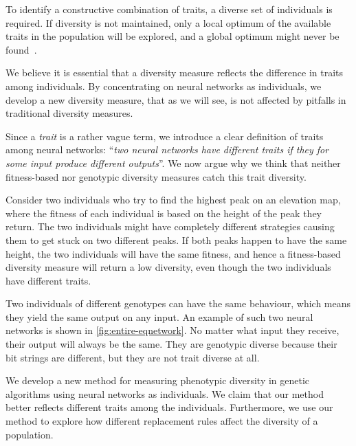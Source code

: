 To identify a constructive combination of traits, a diverse set of individuals is required. If diversity is not maintained, only a local optimum of the available traits in the population will be explored, and a global optimum might never be found~\cite{ursem2002diversity}.

We believe it is essential that a diversity measure reflects the difference in traits among individuals. By concentrating on neural networks as individuals, we develop a new diversity measure, that as we will see, is not affected by pitfalls in traditional diversity measures.

Since a \emph{trait} is a rather vague term, we introduce a clear definition of traits among neural networks: ``\emph{two neural networks have different traits if they for some input produce different outputs}''. We now argue why we think that neither fitness-based nor genotypic diversity measures catch this trait diversity. 

Consider two individuals who try to find the highest peak on an elevation map, where the fitness of each individual is based on the height of the peak they return. The two individuals might have completely different strategies causing them to get stuck on two different peaks. If both peaks happen to have the same height, the two individuals will have the same fitness, and hence a fitness-based diversity measure will return a low diversity, even though the two individuals have different traits.

Two individuals of different genotypes can have the same behaviour, which means they yield the same output on any input. An example of such two neural networks is shown in \cref{fig:entire-eqnetwork}. No matter what input they receive, their output will always be the same. They are genotypic diverse because their bit strings are different, but they are not trait diverse at all.
%

%
We develop a new method for measuring phenotypic diversity in genetic algorithms using neural networks as individuals. We claim that our method better reflects different traits among the individuals. Furthermore, we use our method to explore how different replacement rules affect the diversity of a population.

